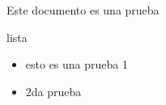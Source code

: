 \documentclass[10pt,letterpaper,final]{article}
\begin{document}
Este documento es una prueba


\begin{frame}{lista}
\begin{itemize}
   \item esto es una prueba 1
   \item 2da prueba
\end{itemize}
\end{frame}
\end{document}
